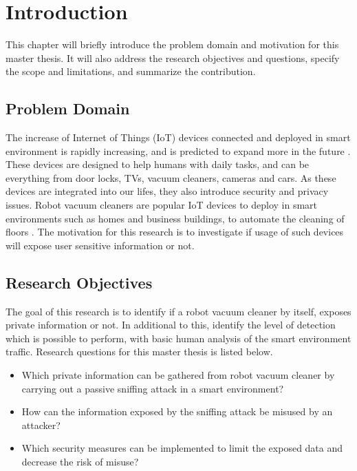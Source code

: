 \chapter{Introduction}

 This chapter will briefly introduce the problem domain and motivation for this master thesis. It will also address the research objectives and questions, specify the scope and limitations, and summarize the contribution.   
\section{Problem Domain}
The increase of Internet of Things (IoT) devices connected and deployed in smart environment is rapidly increasing, and is predicted to expand more in the future \cite{iotgrowth}. These devices are designed to help humans with daily tasks, and can be everything from door locks, TVs, vacuum cleaners, cameras and cars. As these devices are integrated into our lifes, they also introduce security and privacy issues. Robot vacuum cleaners are popular IoT devices to deploy in smart environments such as homes and business buildings, to automate the cleaning of floors \cite{roboticvacuumcleaner2021}. The motivation for this research is to investigate if usage of such devices will expose user sensitive information or not. 

\section{Research Objectives}

The goal of this research is to identify if a robot vacuum cleaner by itself, exposes private information or not. In additional to this, identify the level of detection which is possible to perform, with basic human analysis of the smart environment traffic. Research questions for this master thesis is listed below.
\begin{itemize}
    \item Which private information can be gathered from robot vacuum cleaner by carrying out a passive sniffing attack in a smart environment?
    \item How can the information exposed by the sniffing attack be misused by an attacker?
    \item Which security measures can be implemented to limit the exposed data and decrease the risk of misuse?
\end{itemize}


